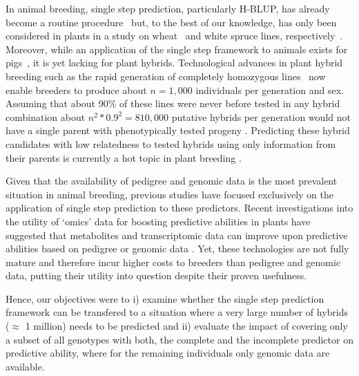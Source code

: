 \documentclass[12pt,titlepage]{article}
\begin{document}
In animal breeding, single step prediction, particularly H-BLUP, has already 
become a routine procedure~\cite{Legarra2014} but, to the best of our knowledge, 
has only been considered in plants in a study on wheat~\cite{Ashraf2016} and
white spruce lines, respectively~\cite{Ratcliffe2017}.
Moreover, while an application of the single step framework to animals exists
for pigs~\cite{Xiang2016}, it is yet lacking for plant hybrids.
Technological advances in plant hybrid breeding such as the rapid generation
of completely homozygous lines~\cite{Wedzony2009} now enable breeders to
produce about $n = 1,000$ individuals per generation and sex.
Assuming that about 90\% of these lines were never before tested in any hybrid
combination about $n^{2} * 0.9^{2} = 810,000$ putative hybrids per generation
would not have a single parent with phenotypically tested progeny
\cite{Westhues2017}.
Predicting these hybrid candidates with low relatedness to tested hybrids using
only information from their parents is currently a hot topic in plant breeding
\cite{Technow2014,Kadam2016,Westhues2017}.

Given that the availability of pedigree and genomic data is the most prevalent
situation in animal breeding, previous studies have focused exclusively on the
application of single step prediction to these predictors.
Recent investigations into the utility of `omics' data for boosting predictive
abilities in plants have suggested that metabolites and transcriptomic data can
improve upon predictive abilities based on pedigree or genomic data
\cite{Guo2016,Xu2016,Dan2016,Zenke-Philippi2017,Westhues2017}.
Yet, these technologies are not fully mature and therefore incur higher costs
to breeders than pedigree and genomic data, putting their utility into question
despite their proven usefulness.

Hence, our objectives were to i) examine whether the single step prediction 
framework can be transfered to a situation where a very large number of hybrids
($\approx$ 1 million) needs to be predicted and ii) evaluate the impact of
covering only a subset of all genotypes with both, the complete and the
incomplete predictor on predictive ability, where for the remaining individuals
only genomic data are available.
\end{document}
